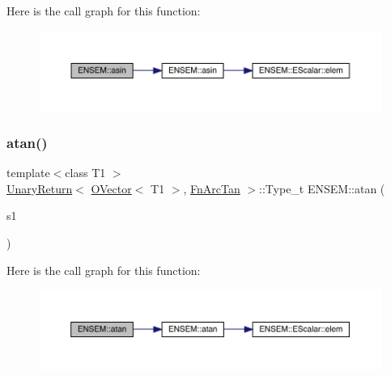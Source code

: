Here is the call graph for this function\+:\nopagebreak
\begin{figure}[H]
\begin{center}
\leavevmode
\includegraphics[width=350pt]{da/d59/group__obsvector_ga90cc9607dddfb6dc09c58de601982b10_cgraph}
\end{center}
\end{figure}
\mbox{\label{group__obsvector_ga1e6e98a68854c39f8ca545ad8dbe328d}} 
\subsubsection{\texorpdfstring{atan()}{atan()}}
{\footnotesize\ttfamily template$<$class T1 $>$ \\
\mbox{\hyperlink{structENSEM_1_1UnaryReturn}{Unary\+Return}}$<$ \mbox{\hyperlink{classENSEM_1_1OVector}{O\+Vector}}$<$ T1 $>$, \mbox{\hyperlink{structENSEM_1_1FnArcTan}{Fn\+Arc\+Tan}} $>$\+::Type\+\_\+t E\+N\+S\+E\+M\+::atan (\begin{DoxyParamCaption}\item[{const \mbox{\hyperlink{classENSEM_1_1OVector}{O\+Vector}}$<$ T1 $>$ \&}]{s1 }\end{DoxyParamCaption})\hspace{0.3cm}{\ttfamily [inline]}}

Here is the call graph for this function\+:\nopagebreak
\begin{figure}[H]
\begin{center}
\leavevmode
\includegraphics[width=350pt]{da/d59/group__obsvector_ga1e6e98a68854c39f8ca545ad8dbe328d_cgraph}
\end{center}
\end{figure}
\mbox{\label{group__obsvector_gae0d11c0b7d0fc49cc1e2765f21d10a2b}} 
